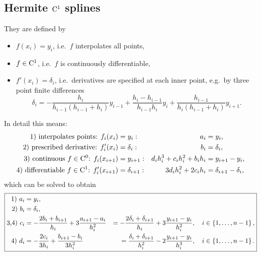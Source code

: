 \subsection{Hermite $\mathrm{C}^1$ splines}
They are defined by
\begin{itemize}
   \item $f(x_i) = y_i$, i.e.\ $f$ interpolates all points,
   \item $f\in\mathrm{C}^1$, i.e.\ $f$ is continuously differentiable,
   \item $f'(x_i) = \delta_i$, i.e.\ derivatives are specified at each inner
       point, e.g.\ by three point finite differences
       \begin{equation*}
       \delta_i=-\frac{h_i}{h_{i-1}(h_{i-1} + h_i)} y_{i-1}
           + \frac{h_i-h_{i-1}}{h_{i-1} h_i} y_i
           + \frac{h_{i-1}}{h_i(h_{i-1} + h_i)} y_{i+1}.
       \end{equation*}
\end{itemize}
In detail this means:
\begin{equation*}
\begin{aligned}
    \text{1) interpolates points: } f_i(x_i) & = y_i: &
    a_i & = y_i,\\
    \text{2) prescribed derivative: } f'_i(x_i) & = \delta_i: &
    b_i & = \delta_i,\\
    \text{3) continuous } f\in\mathrm{C}^0 \text{: } f_i(x_{i+1}) & =y_{i+1}: &
	d_i h_i^3 + c_i h_i^2 + b_i h_i & = y_{i+1}-y_i,\\
    \text{4) differentiable }f\in\mathrm{C}^1 \text{: } f'_i(x_{i+1}) & =\delta_{i+1}: &
    3 d_i h_i^2 + 2 c_i h_i  & = \delta_{i+1}-\delta_i,\\
\end{aligned}
\end{equation*}
which can be solved to obtain
\begin{equation}
\label{eq:hermite_spline_coeffs}
\boxed{
\begin{aligned}
  \text{1) } a_i & =  y_i, \\
  \text{2) } b_i & =  \delta_i, \\
  \text{3,4) } c_i & = -\frac{2 b_i+b_{i+1}}{h_i}+3\frac{a_{i+1}-a_i}{h_i^2}
    & = -\frac{2\delta_i+\delta_{i+1}}{h_i} + 3 \frac{y_{i+1}-y_i}{h_i^2},
        \quad i\in\left\{ 1,\dots,n-1 \right\},\\
  \text{4) } d_i & = -\frac{2 c_i}{3 h_i}+\frac{b_{i+1}-b_i}{3 h_i^2}
    & = \frac{\delta_i+\delta_{i+1}}{h_i^2}-2\frac{y_{i+1}-y_i}{h_i^3},
        \quad i\in\left\{ 1,\dots,n-1 \right\}.
\end{aligned}
}
\end{equation}

